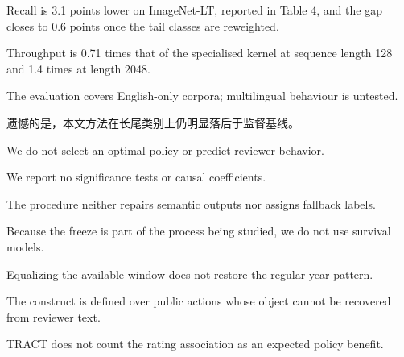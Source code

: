 Recall is 3.1 points lower on ImageNet-LT, reported in Table 4, and the gap closes to 0.6 points once the tail classes are reweighted.

Throughput is 0.71 times that of the specialised kernel at sequence length 128 and 1.4 times at length 2048.

The evaluation covers English-only corpora; multilingual behaviour is untested.

遗憾的是，本文方法在长尾类别上仍明显落后于监督基线。


We do not select an optimal policy or predict reviewer behavior.

We report no significance tests or causal coefficients.

The procedure neither repairs semantic outputs nor assigns fallback labels.

Because the freeze is part of the process being studied, we do not use survival models.

Equalizing the available window does not restore the regular-year pattern.

The construct is defined over public actions whose object cannot be recovered from reviewer text.

TRACT does not count the rating association as an expected policy benefit.
